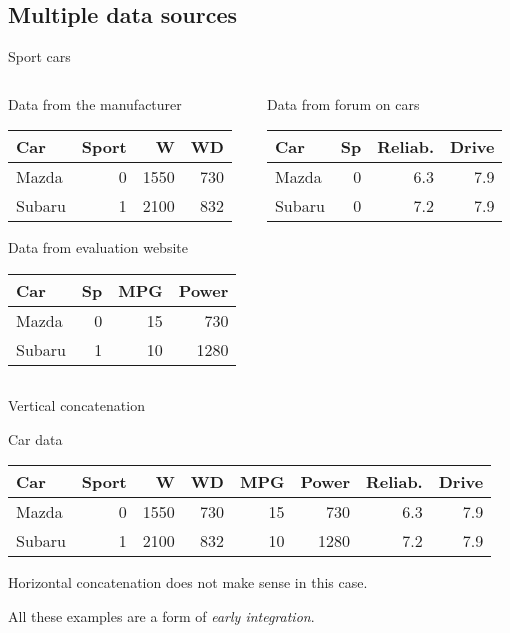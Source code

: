 \documentclass[hyperref={colorlinks=true}]{beamer}
\begin{document}
\subsection{Multiple data sources}
\begin{frame}{Sport cars}
  \begin{columns}[c]
  \begin{column}{.5\textwidth}
    \begin{block}{Data from the manufacturer}
      \begin{tabular}{l|r|rr}
      Car & Sport & W & WD \\
      \hline
      Mazda  & 0 & 1550 & 730 \\
      Subaru & 1 & 2100 & 832 \\
      \hline
      \end{tabular}
    \end{block}
    \begin{block}{Data from evaluation website}
      \begin{tabular}{l|r|rr}
      Car & Sp & MPG & Power \\
      \hline
      Mazda  & 0 & 15 &  730 \\
      Subaru & 1 & 10 & 1280 \\
      \hline
      \end{tabular}
    \end{block}
  \end{column}
  \begin{column}{.5\textwidth}
    \begin{block}{Data from forum on cars}
      \begin{tabular}{l|r|rr}
      Car & Sp & Reliab. & Drive \\
      \hline
      Mazda  & 0 & 6.3 & 7.9 \\
      Subaru & 0 & 7.2 & 7.9 \\
      \hline
      \end{tabular}
    \end{block}
  \end{column}
  \end{columns}
\end{frame}

\begin{frame}{Vertical concatenation}
  \begin{block}{Car data}
    \begin{tabular}{l|r|rrrrrr}
    Car & Sport & W & WD & MPG & Power & Reliab. & Drive \\
    \hline
    Mazda  & 0 & 1550 & 730 & 15 &  730 & 6.3 & 7.9 \\
    Subaru & 1 & 2100 & 832 & 10 & 1280 & 7.2 & 7.9 \\
    \hline
    \end{tabular}
  \end{block}
  \pause
  Horizontal concatenation does not make sense in this case.

  All these examples are a form of \emph{early integration}.

\end{frame}
\end{document}
